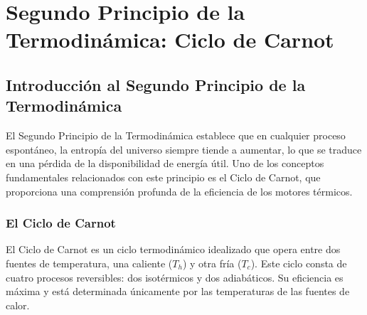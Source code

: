 \documentclass[../main]{subfiles}
\begin{document}
\chapter{Segundo Principio de la Termodinámica: Ciclo de Carnot}

\section{Introducción al Segundo Principio de la Termodinámica}

El Segundo Principio de la Termodinámica establece que en cualquier proceso espontáneo, la entropía del universo siempre tiende a aumentar, lo que se traduce en una pérdida de la disponibilidad de energía útil. Uno de los conceptos fundamentales relacionados con este principio es el Ciclo de Carnot, que proporciona una comprensión profunda de la eficiencia de los motores térmicos.

\subsection{El Ciclo de Carnot}

El Ciclo de Carnot es un ciclo termodinámico idealizado que opera entre dos fuentes de temperatura, una caliente ($T_h$) y otra fría ($T_c$). Este ciclo consta de cuatro procesos reversibles: dos isotérmicos y dos adiabáticos. Su eficiencia es máxima y está determinada únicamente por las temperaturas de las fuentes de calor.

\end{document}
